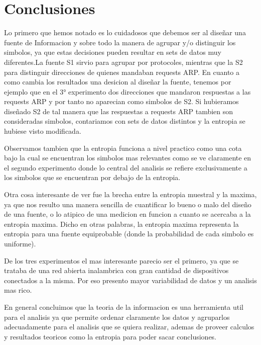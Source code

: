 \section{Conclusiones}

Lo primero que hemos notado es lo cuidadosos que debemos ser al diseñar una fuente de Informacion y sobre todo la manera de agrupar y/o distinguir los simbolos, ya que estas decisiones pueden resultar en sets de datos muy diferentes.La fuente S1 sirvio para agrupar por protocoles, mientras que la S2 para distinguir direcciones de quienes mandaban requests ARP.
En cuanto a como cambia los resultados una desicion al diseñar la fuente, tenemos por ejemplo que en el 3° experimento dos direcciones que mandaron respuestas a las requests ARP y por tanto no aparecian como simbolos de S2. Si hubieramos diseñado S2 de tal manera que las respuestas a requests ARP tambien son consideradas simbolos, contariamos con sets de datos distintos y la entropia se hubiese visto modificada.

Observamos tambien que la entropia funciona a nivel practico como una cota bajo la cual se encuentran los simbolos mas relevantes como se ve claramente en el segundo experimento donde lo central del analisis se refiere exclusivamente a los simbolos que se encuentran por debajo de la entropia.

Otra cosa interesante de ver fue la brecha entre la entropia muestral y la maxima, ya que nos resulto una manera sencilla de cuantificar lo bueno o malo del diseño de una fuente, o lo atipico de una medicion en funcion a cuanto se acercaba a la entropia maxima. Dicho en otras palabras, la entropia maxima representa la entropia para una fuente equiprobable (donde la probabilidad de cada simbolo es uniforme). 

De los tres experimentos el mas interesante parecio ser el primero, ya que se trataba de una red abierta inalambrica con gran cantidad de dispositivos conectados a la misma. Por eso presento mayor variabilidad de datos y un analisis mas rico.

En general concluimos que la teoria de la informacion es una herramienta util para el analisis ya que permite ordenar claramente los datos y agruparlos adecuadamente para el analisis que se quiera realizar, ademas de proveer calculos y resultados teoricos como la entropia para poder sacar conclusiones.